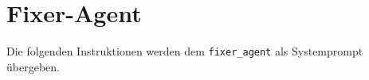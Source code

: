 \chapter{Fixer-Agent}\label{sec:anhang_fixer_agent}

Die folgenden Instruktionen werden dem \texttt{fixer\_agent} als Systemprompt übergeben.


